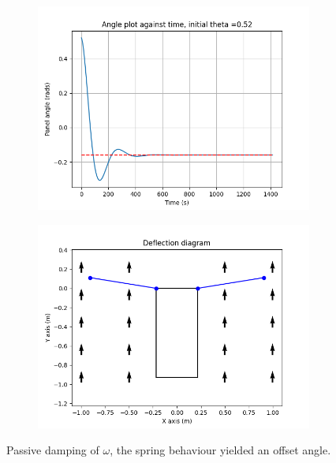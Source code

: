 \begin{figure}[!htb]
\centering
\begin{subfigure}{0.5\textwidth}
  \centering
  \includegraphics[width=1\linewidth]{images/third/theta_plot.png}
  \label{fig:3_theta}
\end{subfigure}%
\begin{subfigure}{.5\textwidth}
  \centering
  \includegraphics[width=1\linewidth]{images/third/deflection_diagram.png}
  \label{fig:3_deflection}
\end{subfigure}
\caption{Passive damping of $\omega$, the spring behaviour yielded an offset angle.}
\label{fig:3_results}
\end{figure}

